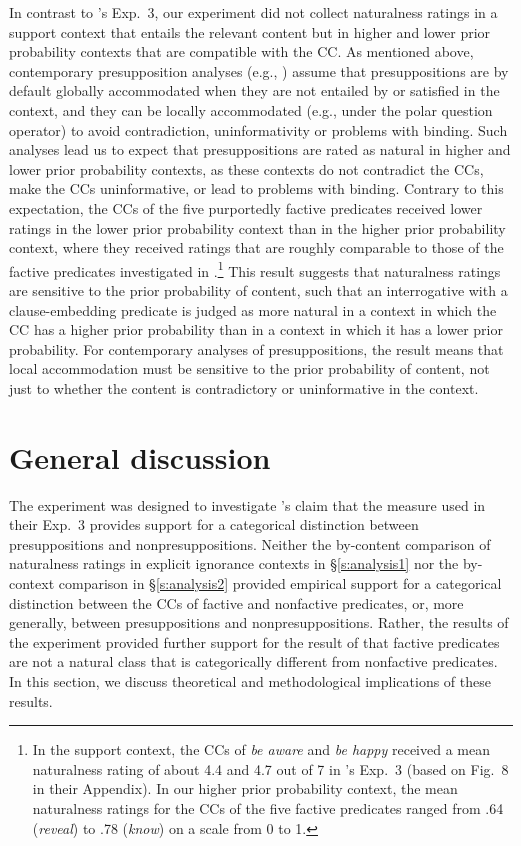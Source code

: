 \documentclass[11pt,fleqn]{article}
\newcommand{\6}{\mbox{$[\hspace*{-.6mm}[$}}
\newcommand{\9}{\mbox{$]\hspace*{-.6mm}]$}}
\newcommand{\citepos}[1]{\citeauthor{#1}'s \citeyear{#1}}
\begin{document}
In contrast to \citepos{mandelkern-etal2020} Exp.~3, our experiment did not collect naturalness ratings in a support context that entails the relevant content but in higher and lower prior probability contexts that are compatible with the CC. As mentioned above, contemporary presupposition analyses (e.g., \citealt{heim83,vds92}) assume that presuppositions are by default globally accommodated when they are not entailed by or satisfied in the context, and they can be locally accommodated (e.g., under the polar question operator) to avoid contradiction, uninformativity or problems with binding. Such analyses lead us to expect that presuppositions are rated as natural in higher and lower prior probability contexts, as these contexts do not contradict the CCs, make the CCs uninformative, or lead to problems with binding. Contrary to this expectation, the CCs of the five purportedly factive predicates received lower ratings in the lower prior probability context than in the higher prior probability context, where they received ratings that are roughly comparable to those of the factive predicates investigated in \citealt{mandelkern-etal2020}.\footnote{In the support context, the CCs of {\em be aware} and {\em be happy} received a mean naturalness rating of about 4.4 and 4.7 out of 7 in \citepos{mandelkern-etal2020} Exp.~3 (based on Fig.~8 in their Appendix). In our higher prior probability context, the mean naturalness ratings for the CCs of the five factive predicates ranged from .64 ({\em reveal}) to .78 ({\em know}) on a scale from 0 to 1.} This result suggests that naturalness ratings are sensitive to the prior probability of content, such that an interrogative with a clause-embedding predicate is judged as more natural in a context in which the CC has a higher prior probability than in a context in which it has a lower prior probability. For contemporary analyses of presuppositions, the result means that local accommodation must be sensitive to the prior probability of content, not just to whether the content is contradictory or uninformative in the context. 
  
\section{General discussion}\label{s3}

The experiment was designed to investigate \citepos{mandelkern-etal2020} claim that the measure used in their Exp.~3 provides support for a categorical distinction between presuppositions and nonpresuppositions. Neither the by-content comparison of naturalness ratings in explicit ignorance contexts  in \S\ref{s:analysis1} nor the by-context comparison in \S\ref{s:analysis2} provided empirical support for a categorical distinction between the CCs of factive and nonfactive predicates, or, more generally, between presuppositions and nonpresuppositions. Rather, the results of the experiment provided further support for the result of \citealt{degen-tonhauser-language} that factive predicates are not a natural class that is categorically different from nonfactive predicates. In this section, we discuss theoretical and methodological implications of these results.
\end{document}
